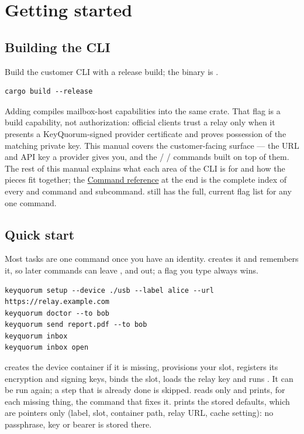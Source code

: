 \section{Getting started}

\subsection{Building the CLI}

Build the customer CLI with a release build; the binary is
.

\begin{lstlisting}
cargo build --release
\end{lstlisting}

Adding  compiles mailbox-host capabilities into
the same crate. That flag is a build capability, not authorization: official
clients trust a relay only when it presents a KeyQuorum-signed provider
certificate and proves possession of the matching private key. This manual
covers the customer-facing surface --- the URL and API key a provider gives
you, and the  /  /  commands
built on top of them. The rest of this manual explains what each area of
the CLI is for and how the pieces fit together; the
\hyperref[sec:command-reference]{Command reference} at the end is the
complete index of every  and 
command and subcommand.  still has the
full, current flag list for any one command.

\subsection{Quick start}

Most tasks are one command once you have an identity.  creates it
and  remembers it, so later commands can leave ,
 and  out; a flag you type always wins.

\begin{lstlisting}
keyquorum setup --device ./usb --label alice --url https://relay.example.com
keyquorum doctor --to bob
keyquorum send report.pdf --to bob
keyquorum inbox
keyquorum inbox open
\end{lstlisting}

 creates the device container if it is missing, provisions your
slot, registers its encryption and signing keys, binds the slot, loads the relay
key and runs . It can be run again; a step that is already done is
skipped.  reads only and prints, for each missing thing, the
command that fixes it.  prints the stored defaults, which are
pointers only (label, slot, container path, relay URL, cache setting): no
passphrase, key or bearer is stored there.

